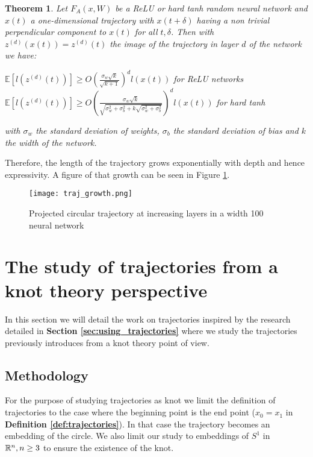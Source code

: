 \documentclass[12pt, a4paper]{article}
\newtheorem{theorem}{Theorem}
\begin{document}
\begin{theorem}
  Let $F_A(x,W)$ be a ReLU or hard tanh random neural network and $x(t)$ a one-dimensional trajectory with $x(t + \delta)$ having a non trivial perpendicular component to $x(t)$ for all $t,\delta$. Then with $z^{(d)}(x(t)) = z^{(d)}(t)$ the image of the trajectory in layer $d$ of the network we have:
  \begin{center}
    $\mathbb{E}[l(z^{(d)}(t))] \ge O(\frac{\sigma_w \sqrt{k}}{\sqrt{k+1}})^d l(x(t))$ for ReLU networks\\
    $\mathbb{E}[l(z^{(d)}(t))] \ge O(\frac{\sigma_w \sqrt{k}}{\sqrt{\sigma_w^2 + \sigma_b^2 + k\sqrt{\sigma_w^2 + \sigma_b^2}}})^d l(x(t))$ for hard tanh
  \end{center}
  with $\sigma_w$ the standard deviation of weights, $\sigma_b$ the standard deviation of bias and $k$ the width of the network.
\end{theorem}

Therefore, the length of the trajectory grows exponentially with depth and hence expressivity. A figure of that growth can be seen in Figure \ref{fig:traj_growth}.

\begin{figure}[H]
  \centering
  \texttt{[image: traj\_growth.png]}
  \caption{Projected circular trajectory at increasing layers in a width 100 neural network}
  \label{fig:traj_growth}
\end{figure}

\newpage
\thispagestyle{empty}
\mbox{}
\newpage

\section{The study of trajectories from a knot theory perspective}

In this section we will detail the work on trajectories inspired by the research detailed in \textbf{Section \ref{sec:using_trajectories}} where we study the trajectories previously introduces from a knot theory point of view.

\subsection{Methodology}

For the purpose of studying trajectories as knot we limit the definition of trajectories to the case where the beginning point is the end point ($x_0 = x_1$ in \textbf{Definition \ref{def:trajectories}}). In that case the trajectory becomes an embedding of the circle. We also limit our study to embeddings of $S^1$ in $\mathbb{R}^n, n \ge 3$ to ensure the existence of the knot.\\ 
\end{document}
